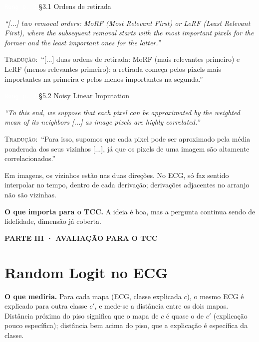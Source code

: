 \documentclass[11pt,a4paper]{article}
\newcommand{\pagechip}[1]{{\setlength{\fboxsep}{1.5pt}\colorbox{cAcc}{\textcolor{white}{\scriptsize\texttt{#1}}}}}
\newcommand{\partbar}[1]{\par\vspace{1.2em}\noindent\colorbox{black!80}{\parbox{\dimexpr\linewidth-2\fboxsep}{\color{white}\bfseries\sffamily\MakeUppercase{#1}}}\par\vspace{0.4em}}
\newenvironment{origquote}{\par\itshape\small}{\par}
\newenvironment{tradquote}{\par\small\textsc{Tradução:}\ }{\par}
\newcommand{\explab}[1]{\par\smallskip{\small\color{cAcc}\textbf{\MakeUppercase{#1}}}\par}
\begin{document}
\begin{citacard}{\pagechip{Rong p. 3} §3.1 Ordens de retirada}
\begin{origquote}“[...] two removal orders: MoRF (Most Relevant First) or LeRF (Least Relevant First), where the subsequent removal starts with the most important pixels for the former and the least important ones for the latter.”\end{origquote}
\begin{tradquote}“[...] duas ordens de retirada: MoRF (mais relevantes primeiro) e LeRF (menos relevantes primeiro); a retirada começa pelos pixels mais importantes na primeira e pelos menos importantes na segunda.”\end{tradquote}
\end{citacard}

\begin{citacard}{\pagechip{Rong p. 7} §5.2 Noisy Linear Imputation}
\begin{origquote}“To this end, we suppose that each pixel can be approximated by the weighted mean of its neighbors [...] as image pixels are highly correlated.”\end{origquote}
\begin{tradquote}“Para isso, supomos que cada pixel pode ser aproximado pela média ponderada dos seus vizinhos [...], já que os pixels de uma imagem são altamente correlacionados.”\end{tradquote}
\explab{Explicação}
Em imagens, os vizinhos estão nas duas direções. No ECG, só faz sentido interpolar no tempo, dentro de cada derivação; derivações adjacentes no arranjo não são vizinhas.
\end{citacard}

\textbf{O que importa para o TCC.} A ideia é boa, mas a pergunta continua sendo de fidelidade, dimensão já coberta.

\partbar{Parte III · Avaliação para o TCC}

\section{Random Logit no ECG}
\textbf{O que mediria.} Para cada mapa (ECG, classe explicada $c$), o mesmo ECG é explicado para outra classe $c'$, e mede-se a distância entre os dois mapas. Distância próxima do piso significa que o mapa de $c$ é quase o de $c'$ (explicação pouco específica); distância bem acima do piso, que a explicação é específica da classe.
\end{document}
